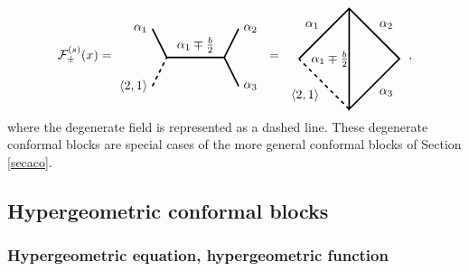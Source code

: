 \documentclass[12pt, a4paper, notitlepage, twoside]{report}
\numberwithin{equation}{section}
\theoremstyle{break}
\begin{document}
\begin{align}
 \mathcal{F}^{(s)}_\pm(x)  =  
 \begin{tikzpicture}[baseline=(current  bounding  box.center), very thick, scale = .4]
\draw (-1,2) node [left] {$\alpha_1$} -- (0,0) -- node [above] {$\alpha_1\mp \frac{b}{2}$} (4,0) -- (5,2) node [right] {$\alpha_2$};
\draw[dashed] (-1,-2) node [left] {$\langle 2,1 \rangle$} -- (0,0);
\draw (4,0) -- (5,-2) node [right] {$\alpha_3$};
\end{tikzpicture}
\ =\ 
\begin{tikzpicture}[baseline=(current  bounding  box.center), very thick, scale = .7]
\draw[dashed] (0, -2) -- node [below left] {$\langle 2,1 \rangle$} (-2, 0); 
\draw (-2, 0) -- node [above left] {$\alpha_1$} (0, 2) -- node [above right] {$\alpha_2$} (2, 0) -- node [below right] {$\alpha_3$} (0, -2) -- node [left] {$\alpha_1\mp \frac{b}{2}\! \! $} (0, 2); 
\end{tikzpicture}
\  \ ,
\label{gpic}
\end{align}
where the degenerate field is represented as a dashed line.
These degenerate conformal blocks are special cases of the more general conformal blocks of Section \ref{secaco}.


\subsection{Hypergeometric conformal blocks \label{sechcb}}

\subsubsection{Hypergeometric equation, hypergeometric function}
\end{document}
